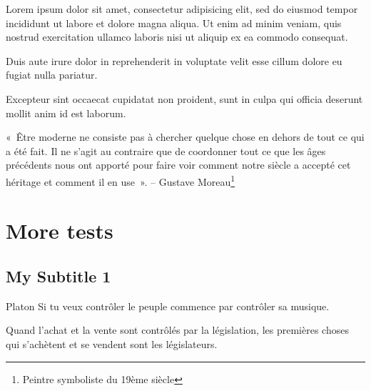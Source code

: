 \documentclass[openany]{book} %
\def\MYxFONT{\rm}   %
\begin{document}
\bigskip

\begin{multicols}{3}

Lorem ipsum dolor sit amet, consectetur adipisicing elit, sed do eiusmod tempor incididunt ut labore et dolore magna aliqua. Ut enim ad minim veniam, quis nostrud exercitation ullamco laboris nisi ut aliquip ex ea commodo consequat. 

\bigskip

Duis aute irure dolor in reprehenderit in voluptate velit esse cillum dolore eu fugiat nulla pariatur. 

\end{multicols}

Excepteur sint occaecat cupidatat non proident, sunt in culpa qui officia deserunt mollit anim id est laborum.

«~Être moderne ne consiste pas à chercher quelque chose en dehors de tout ce qui a été fait. Il ne s'agit au contraire que de coordonner tout ce que les âges précédents nous ont apporté pour faire voir comment notre siècle a accepté cet héritage et comment il en use~». -- Gustave Moreau\footnote{\MYxFONT Peintre symboliste du 19ème siècle}

\par\noindent \parag 

\troisetoiles

\hypertarget{toc17}{}
\pagebreak[\PAGExBREAKxPOLICY]
\part{More tests}

\hypertarget{toc18}{}
\pagebreak[\PAGExBREAKxPOLICY]
\chapter{My Subtitle 1}

\begin{exergue}{Platon}
Si tu veux contrôler le peuple commence par contrôler sa musique.
\end{exergue}

\begin{exergue}{}
Quand l'achat et la vente sont contrôlés par la législation, les premières choses qui s'achètent et se vendent sont les législateurs.
\\[\EXERGUExAUTHORxSPACE pt] \EXERGUExSIZE {} 
\end{exergue}
\end{document}

